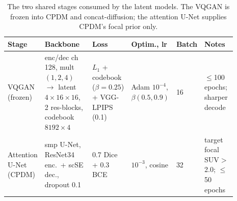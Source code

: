 \documentclass[11pt,a4paper]{article}
\begin{document}
\begin{table}[h]\centering\footnotesize
\setlength{\tabcolsep}{4pt}
\renewcommand{\arraystretch}{1.25}
\caption[Shared supporting-stage hyperparameters]{The two shared stages consumed by the latent
models. The VQGAN is frozen into CPDM and concat-diffusion; the attention U-Net supplies CPDM's
focal prior only.}
\label{tab:hp-support}
\begin{tabular}{p{0.13\linewidth} p{0.25\linewidth} p{0.19\linewidth} p{0.12\linewidth} p{0.045\linewidth} p{0.15\linewidth}}
\toprule
Stage & Backbone & Loss & Optim., lr & Batch & Notes \\
\midrule
VQGAN (frozen) & enc/dec ch 128, mult $(1,2,4)$ $\to$ latent $4{\times}16{\times}16$, 2 res-blocks, codebook $8192{\times}4$ & $L_1$ + codebook ($\beta{=}0.25$) + VGG-LPIPS (0.1) & Adam $10^{-4}$, $\beta(0.5,0.9)$ & 16 & $\le$100 epochs; sharper decode \\
Attention U-Net (CPDM) & smp U-Net, ResNet34 enc.\ + scSE dec., dropout 0.1 & 0.7 Dice + 0.3 BCE & $10^{-3}$, cosine & 32 & target focal SUV$>$2.0; $\le$50 epochs \\
\bottomrule
\end{tabular}
\end{table}
\end{document}
